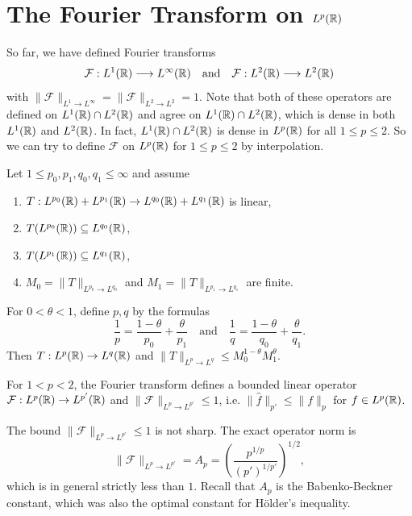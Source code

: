 \section{The Fourier Transform on \texorpdfstring{$L^p(\mathbb{R})$}{Lp(R)}}

\begin{remark}
  So far, we have defined Fourier transforms
  \[
    \mathcal{F} : L^1(\mathbb{R}) \longrightarrow L^\infty(\mathbb{R})
    \quad \text{and} \quad \mathcal{F} : L^2(\mathbb{R}) \longrightarrow L^2(\mathbb{R})
  \]
  with $\|\mathcal{F}\|_{L^1 \to L^\infty} = \|\mathcal{F}\|_{L^2 \to L^2} = 1$.
  Note that both of these operators
  are defined on
  $L^1(\mathbb{R}) \cap L^2(\mathbb{R})$ and agree on
  $L^1(\mathbb{R}) \cap L^2(\mathbb{R})$, which is
  dense in both $L^1(\mathbb{R})$ and $L^2(\mathbb{R})$.
  In fact, $L^1(\mathbb{R}) \cap L^2(\mathbb{R})$
  is dense in $L^p(\mathbb{R})$ for all $1 \le p \le 2$.
  So we can try to define
  $\mathcal{F}$ on $L^p(\mathbb{R})$
  for $1 \le p \le 2$ by interpolation.
\end{remark}

\begin{theorem}
  Let $1 \le p_0, p_1, q_0, q_1 \le \infty$
  and assume
  \begin{enumerate}
    \item $T : L^{p_0}(\mathbb{R}) + L^{p_1}(\mathbb{R}) \to L^{q_0}(\mathbb{R}) + L^{q_1}(\mathbb{R})$
      is linear,
    \item $T(L^{p_0}(\mathbb{R})) \subseteq L^{q_0}(\mathbb{R})$,
    \item $T(L^{p_1}(\mathbb{R})) \subseteq L^{q_1}(\mathbb{R})$,
    \item $M_0 = \|T\|_{L^{p_0} \to L^{q_0}}$ and
      $M_1 = \|T\|_{L^{p_1} \to L^{q_1}}$
      are finite.
  \end{enumerate}
  For $0 < \theta < 1$, define $p, q$ by the formulas
  \[
    \frac{1}{p} = \frac{1 - \theta}{p_0} + \frac{\theta}{p_1}
    \quad \text{and} \quad
    \frac{1}{q} = \frac{1 - \theta}{q_0} + \frac{\theta}{q_1}.
  \]
  Then $T : L^p(\mathbb{R}) \to L^q(\mathbb{R})$
  and $\|T\|_{L^p \to L^q} \le M_0^{1 - \theta} M_1^{\theta}$.
\end{theorem}

\begin{theorem}
  For $1 < p < 2$, the Fourier transform
  defines a bounded linear operator
  $\mathcal{F} : L^p(\mathbb{R}) \to L^{p'}(\mathbb{R})$ and
  $\|\mathcal{F}\|_{L^p \to L^{p'}} \le 1$,
  i.e. $\|\widehat{f}\|_{p'} \le \|f\|_p$ for $f \in L^p(\mathbb{R})$.
\end{theorem}

\begin{remark}
  The bound $\|\mathcal{F}\|_{L^p \to L^{p'}} \le 1$
  is not sharp. The exact operator norm is
  \[
    \|\mathcal{F}\|_{L^p \to L^{p'}}
    = A_p =
    \left(
      \frac{p^{1 / p}}{(p')^{1 / p'}}
    \right)^{1 / 2},
  \]
  which is in general strictly less than $1$.
  Recall that $A_p$ is the Babenko-Beckner constant,
  which was also the optimal constant for
  H\"older's inequality.
\end{remark}
